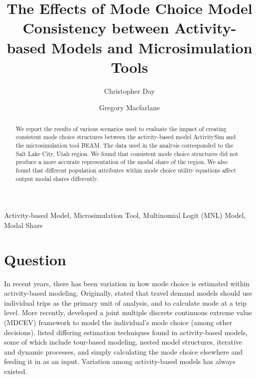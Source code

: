 \documentclass[]{elsarticle} %
\begin{document}
\begin{frontmatter}

  \title{The Effects of Mode Choice Model Consistency between Activity-based Models and Microsimulation Tools}
    \author[Brigham Young University]{Christopher Day}
    \author[Brigham Young University]{Gregory Macfarlane}
      \address[Brigham Young University]{Civil and Environmental Engineering Department, 430 Engineering Building, Provo, Utah 84602}
  
  \begin{abstract}
  We report the results of various scenarios used to evaluate the impact of creating consistent mode choice structures between the activity-based model ActivitySim and the microsimulation tool BEAM. The data used in the analysis corresponded to the Salt Lake City, Utah region. We found that consistent mode choice structures did not produce a more accurate representation of the modal share of the region. We also found that different population attributes within mode choice utility equations affect output modal shares differently.
  \end{abstract}
   \begin{keyword} Activity-based Model, Microsimulation Tool, Multinomial Logit (MNL) Model, Modal Share\end{keyword}
 \end{frontmatter}

\hypertarget{intro}{%
\section{Question}\label{intro}}

In recent years, there has been variation in how mode choice is estimated within activity-based modeling. Originally, \citet{bhat1999activity} stated that travel demand models should use individual trips as the primary unit of analysis, and to calculate mode at a trip level. More recently, \citet{eluru2010econometric} developed a joint multiple discrete continuous extreme value (MDCEV) framework to model the individual's mode choice (among other decisions). \citet{hasnine2021tour} listed differing estimation techniques found in activity-based models, some of which include tour-based modeling, nested model structures, iterative and dynamic processes, and simply calculating the mode choice elsewhere and feeding it in as an input. Variation among activity-based models has always existed.
\end{document}
